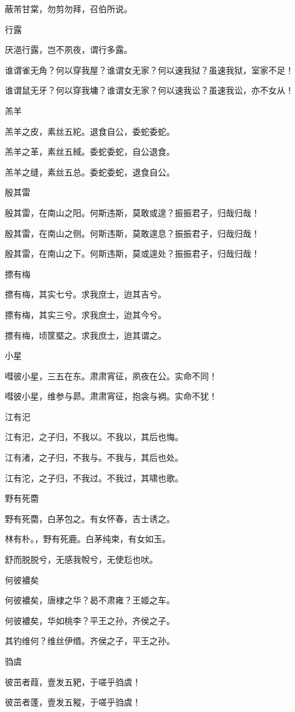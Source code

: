 蔽芾甘棠，勿剪勿拜，召伯所说。

行露

厌浥行露，岂不夙夜，谓行多露。

谁谓雀无角？何以穿我屋？谁谓女无家？何以速我狱？虽速我狱，室家不足！

谁谓鼠无牙？何以穿我墉？谁谓女无家？何以速我讼？虽速我讼，亦不女从！

羔羊

羔羊之皮，素丝五紽。退食自公，委蛇委蛇。

羔羊之革，素丝五緎。委蛇委蛇，自公退食。

羔羊之缝，素丝五总。委蛇委蛇，退食自公。

殷其雷

殷其雷，在南山之阳。何斯违斯，莫敢或遑？振振君子，归哉归哉！

殷其雷，在南山之侧。何斯违斯，莫敢遑息？振振君子，归哉归哉！

殷其雷，在南山之下。何斯违斯，莫或遑处？振振君子，归哉归哉！

摽有梅

摽有梅，其实七兮。求我庶士，迨其吉兮。

摽有梅，其实三兮。求我庶士，迨其今兮。

摽有梅，顷筐塈之。求我庶士，迨其谓之。

小星

嘒彼小星，三五在东。肃肃宵征，夙夜在公。实命不同！

嘒彼小星，维参与昴。肃肃宵征，抱衾与裯。实命不犹！

江有汜

江有汜，之子归，不我以。不我以，其后也悔。

江有渚，之子归，不我与。不我与，其后也处。

江有沱，之子归，不我过。不我过，其啸也歌。

野有死麕

野有死麕，白茅包之。有女怀春，吉士诱之。

林有朴。，野有死鹿。白茅纯束，有女如玉。

舒而脱脱兮，无感我帨兮，无使尨也吠。

何彼襛矣

何彼襛矣，唐棣之华？曷不肃雍？王姬之车。

何彼襛矣，华如桃李？平王之孙，齐侯之子。

其钓维何？维丝伊缗。齐侯之子，平王之孙。

驺虞

彼茁者葭，壹发五豝，于嗟乎驺虞！

彼茁者蓬，壹发五豵，于嗟乎驺虞！




